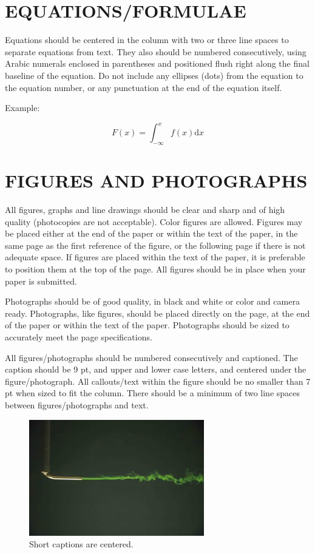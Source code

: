 \documentclass[twocolumn,10pt]{hphrc}
\begin{document}
\section*{EQUATIONS/FORMULAE}

Equations should be centered in the column with two or three line spaces to separate equations from text. They also should be numbered consecutively, using Arabic numerals enclosed in parentheses and positioned flush right along the final baseline of the equation. Do not include any ellipses (dots) from the equation to the equation number, or any punctuation at the end of the equation itself.

Example:

\begin{equation}
F(x) = \int_{-\infty}^x f(x) \mathrm{d}x
\label{eq_1}
\end{equation}

\section*{FIGURES AND PHOTOGRAPHS}

All figures, graphs and line drawings should be clear and sharp and of high quality (photocopies are not acceptable). Color figures are allowed. Figures may be placed either at the end of the paper or within the text of the paper, in the same page as the first reference of the figure, or the following page if there is not adequate space. If figures are placed within the text of the paper, it is preferable to position them at the top of the page. All figures should be in place when your paper is submitted.

Photographs should be of good quality, in black and white or color and camera ready. Photographs, like figures, should be placed directly on the page, at the end of the paper or within the text of the paper. Photographs should be sized to accurately meet the page specifications.

All figures/photographs should be numbered consecutively and captioned. The caption should be 9 pt, and upper and lower case letters, and centered under the figure/photograph. All callouts/text within the figure should be no smaller than 7 pt when sized to fit the column.
There should be a minimum of two line spaces between figures/photographs and text.


	\begin{figure}[t]
	\centering
	\includegraphics[width=3in]{SampleImage1}
	\caption{Short captions are centered.}
	\label{figure1}
	\end{figure}
\end{document}
